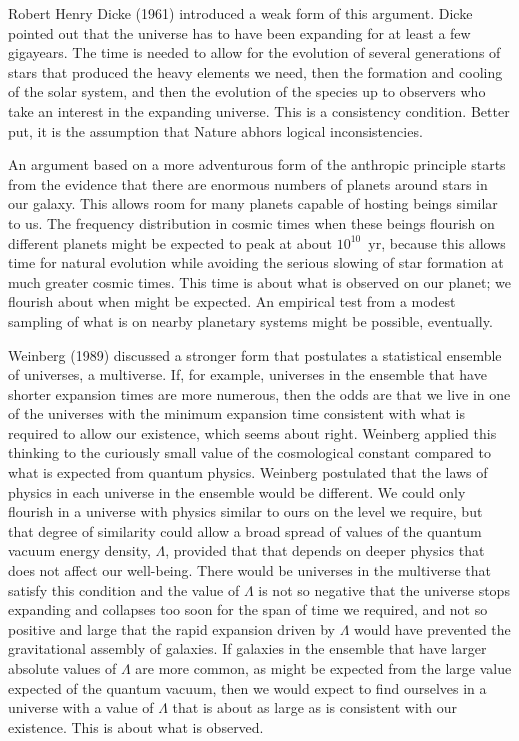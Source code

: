 \documentclass[fleqn,usenatbib]{mnras}
\begin{document}
Robert Henry Dicke (1961) introduced a weak form of this argument. Dicke pointed out that  the universe has to have been expanding for at least a few gigayears. The time is needed to allow for the evolution of several generations of stars that produced the heavy elements we need, then the formation and cooling of the solar system, and then the evolution of the species up to observers who take an interest in the expanding universe. This is a consistency condition. Better put, it is the assumption that Nature abhors logical inconsistencies. 

An argument based on a more adventurous form of the anthropic principle starts from the evidence that there are enormous numbers of planets around stars in our galaxy. This allows room for many planets capable of hosting beings similar to us. The frequency distribution in cosmic times when these beings flourish on different planets might be expected to peak at about $10^{10}$~yr, because this allows time for natural evolution while avoiding the serious slowing of star formation at much greater cosmic times. This time is about what is observed on our planet; we flourish about when might be expected. An empirical test from a modest sampling of what is on nearby planetary systems might be possible, eventually. 

 Weinberg (1989) discussed a stronger form that postulates a statistical ensemble of universes, a multiverse. If, for example, universes in the ensemble that have shorter expansion times are more numerous, then the odds are that we live in one of the universes with the minimum expansion time consistent with what is required to allow our existence, which seems about right. Weinberg applied this thinking to the curiously small value of the cosmological constant compared to what is expected from quantum physics. Weinberg postulated that the laws of physics in each universe in the ensemble would be different. We could only flourish in a universe with physics similar to ours on the level we require, but that degree of similarity could allow a broad spread of values of the quantum vacuum energy density, $\Lambda$, provided that that depends on deeper physics that does not affect our well-being. There would be universes in the multiverse that satisfy this condition and the value of $\Lambda$ is not so negative that the universe stops expanding and collapses too soon for the span of time we required, and not so positive and large that the rapid expansion driven by $\Lambda$ would have prevented the gravitational assembly of galaxies. If galaxies in the ensemble that have larger absolute values of $\Lambda$ are more common, as might be expected from the large value expected of the quantum vacuum, then we would expect to find ourselves in a universe with a value of $\Lambda$ that is about as large as is consistent with our existence. This is about what is observed. 
\end{document}
